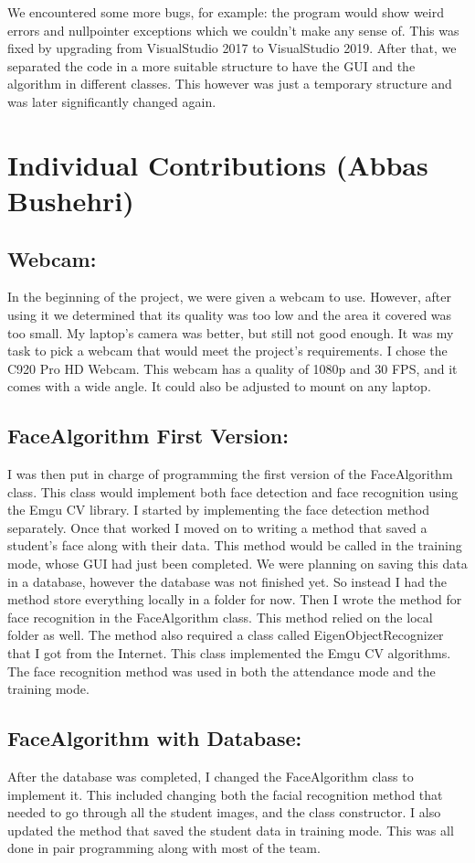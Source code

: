 \documentclass[12pt, a4paper]{article}
\begin{document}
We encountered some more bugs, for example: the program would show weird errors and nullpointer exceptions which we couldn't make any sense of. This was fixed by upgrading from VisualStudio 2017 to VisualStudio 2019. After that, we separated the code in a more suitable structure to have the GUI and the algorithm in different classes. This however was just a temporary structure and was later significantly changed again.
\newpage

\section{Individual Contributions (Abbas Bushehri)}
\subsection{Webcam:}
In the beginning of the project, we were given a webcam to use. However, after using it we determined that its quality was too low and the area it covered was too small. My laptop’s camera was better, but still not good enough. It was my task to pick a webcam that would meet the project’s requirements. I chose the C920 Pro HD Webcam. This webcam has a quality of 1080p and 30 FPS, and it comes with a wide angle. It could also be adjusted to mount on any laptop.

\subsection{FaceAlgorithm First Version:}
I was then put in charge of programming the first version of the FaceAlgorithm class. This class would implement both face detection and face recognition using the Emgu CV library. I started by implementing the face detection method separately. Once that worked I moved on to writing a method that saved a student’s face along with their data. This method would be called in the training mode, whose GUI had just been completed. We were planning on saving this data in a database, however the database was not finished yet. So instead I had the method store everything locally in a folder for now. Then I wrote the method for face recognition in the FaceAlgorithm class. This method relied on the local folder as well. The method also required a class called EigenObjectRecognizer that I got from the Internet. This class implemented the Emgu CV algorithms. The face recognition method was used in both the attendance mode and the training mode.

\subsection{FaceAlgorithm with Database:}
After the database was completed, I changed the FaceAlgorithm class to implement it. This included changing both the facial recognition method that needed to go through all the student images, and the class constructor. I also updated the method that saved the student data in training mode. This was all done in pair programming along with most of the team.
\end{document}
